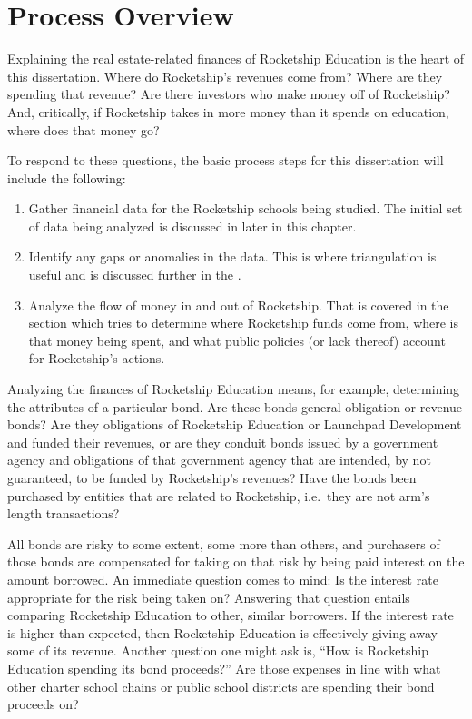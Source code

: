 \section{Process Overview}\label{sec:process-overview}\indent

Explaining the real estate-related finances of Rocketship Education is the heart of this dissertation. Where do Rocketship's revenues come from? Where are they spending that revenue? Are there investors who make money off of Rocketship? And, critically, if Rocketship takes in more money than it spends on education, where does that money go?

To respond to these questions, the basic process steps for this dissertation will include the following:

\begin{enumerate}
  \item Gather financial data for the Rocketship schools being studied. The initial set of data being analyzed is discussed in  later in this chapter.
  \item Identify any gaps or anomalies in the data. This is where triangulation is useful and is discussed further in the . 
  \item Analyze the flow of money in and out of Rocketship. That  is covered in the section  which tries to determine where Rocketship funds come from, where is that money being spent, and what public policies (or lack thereof) account for Rocketship's actions.
\end{enumerate}

Analyzing the finances of Rocketship Education means, for example, determining
the attributes of a particular bond. Are these bonds general obligation or revenue bonds? Are they obligations of Rocketship Education or Launchpad Development and funded their revenues, or are they conduit bonds issued by a government agency and obligations of that government agency that are intended, by not guaranteed, to be funded by Rocketship's revenues? Have the bonds been purchased by entities that are related to Rocketship, i.e.~they are not arm's length transactions? 

All bonds are risky to some extent, some more than others, and purchasers of those bonds are compensated for taking on that risk by being paid interest on the amount borrowed. An immediate question comes to mind: Is the interest rate appropriate for the risk being taken on? Answering that question entails comparing Rocketship Education to other, similar borrowers. If the interest rate is higher than expected, then Rocketship Education is effectively giving away some of its revenue. Another question one might ask is, ``How is Rocketship Education spending its bond proceeds?'' Are those expenses in line with what other charter school chains or public school districts are spending their bond proceeds on?


